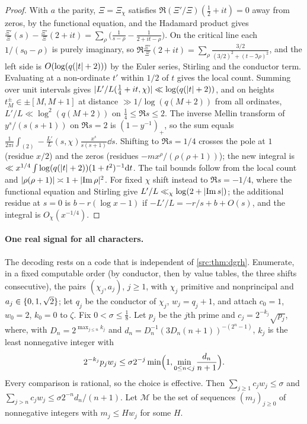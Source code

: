 \begin{proof}
With $a$ the parity, $\Xi=\Xi_\chi$ satisfies $\Re(\Xi'/\Xi)(\tfrac12+it)=0$ away from zeros, by the
functional equation, and the Hadamard product gives
$\frac{\Xi'}\Xi(s)-\frac{\Xi'}\Xi(2+it)=\sum_\rho\bigl(\frac1{s-\rho}-\frac1{2+it-\rho}\bigr)$. On the
critical line each $1/(s_0-\rho)$ is purely imaginary, so
$\Re\frac{\Xi'}\Xi(2+it)=\sum_\rho\frac{3/2}{(3/2)^2+(t-\Im\rho)^2}$, and the left side is
$O(\log(q(\lvert t\rvert+2)))$ by the Euler series, Stirling and the conductor term. Evaluating at a
non-ordinate $t'$ within $1/2$ of $t$ gives the local count. Summing over unit intervals gives
$\lvert L'/L(\tfrac14+it,\chi)\rvert\ll\log(q(\lvert t\rvert+2))$, and on heights $t_M^\pm\in\pm[M,M+1]$ at
distance $\gg1/\log(q(M+2))$ from all ordinates, $L'/L\ll\log^2(q(M+2))$ on $\tfrac14\le\Re s\le2$.
The inverse Mellin transform of $y^s/(s(s+1))$ on $\Re s=2$ is $(1-y^{-1})_+$, so the sum equals
$\frac1{2\pi i}\int_{(2)}-\frac{L'}L(s,\chi)\frac{x^s}{s(s+1)}\dd s$. Shifting to $\Re s=1/4$ crosses
the pole at $1$ (residue $x/2$) and the zeros (residues $-mx^\rho/(\rho(\rho+1))$); the new integral
is $\ll x^{1/4}\int\log(q(\lvert t\rvert+2))(1+t^2)^{-1}\mathrm{d} t$. The tail bounds follow from the local count
and $\lvert\rho(\rho+1)\rvert\asymp1+\lvert\operatorname{Im}\rho\rvert^2$. For fixed $\chi$ shift instead to $\Re s=-1/4$, where
the functional equation and Stirling give $L'/L\ll_\chi\log(2+\lvert\operatorname{Im} s\rvert)$; the additional residue
at $s=0$ is $b-r(\log x-1)$ if $-L'/L=-r/s+b+O(s)$, and the integral is $O_\chi(x^{-1/4})$.
\end{proof}

\paragraph{One real signal for all characters.}
The decoding rests on a code that is independent of \cref{src:thm:dgrh}. Enumerate, in a fixed
computable order (by conductor, then by value tables, the three shifts consecutive), the pairs
$(\chi_j,a_j)$, $j\ge1$, with $\chi_j$ primitive and nonprincipal and $a_j\in\{0,1,\sqrt2\}$; let $q_j$ be the
conductor of $\chi_j$, $w_j=q_j+1$, and attach $c_0=1$, $w_0=2$, $k_0=0$ to $\zeta$. Fix
$0<\sigma\le\tfrac18$. Let $p_j$ be the $j$th prime and $c_j=2^{-k_j}\sqrt{p_j}$, where, with
$D_n=2^{\max_{j\le n}k_j}$ and $d_n=D_n^{-1}(3D_n(n+1))^{-(2^n-1)}$, $k_j$ is the least nonnegative integer with
\[
 2^{-k_j}p_jw_j\le\sigma2^{-j}\min\Bigl(1,\min_{0\le n<j}\frac{d_n}{n+1}\Bigr).
\]
Every comparison is rational, so the choice is effective. Then $\sum_{j\ge1}c_jw_j\le\sigma$ and
$\sum_{j>n}c_jw_j\le\sigma2^{-n}d_n/(n+1)$. Let $\mathcal M$ be the set of sequences $(m_j)_{j\ge0}$ of
nonnegative integers with $m_j\le Hw_j$ for some $H$.

